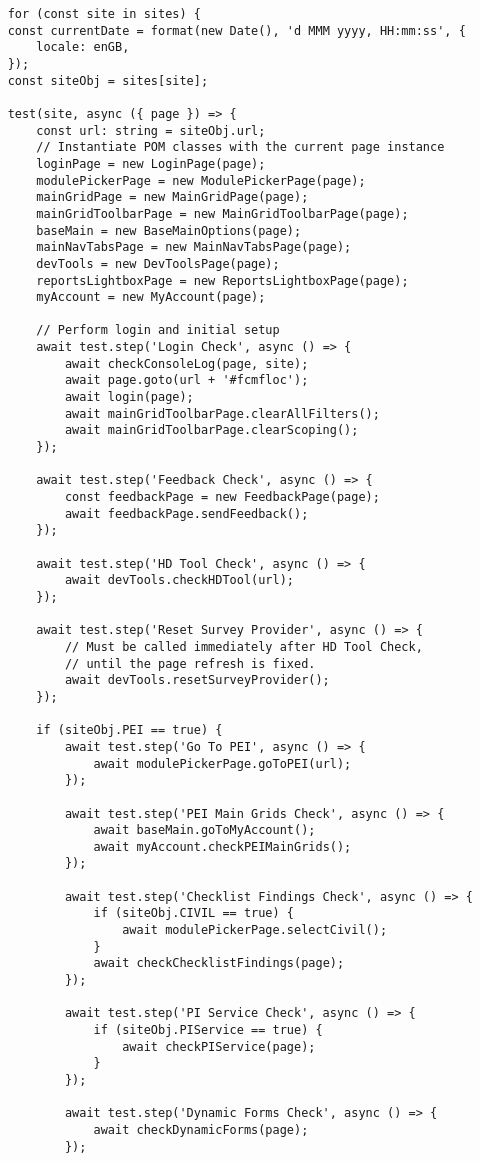 \begin{verbatim}
    for (const site in sites) {
    const currentDate = format(new Date(), 'd MMM yyyy, HH:mm:ss', {
        locale: enGB,
    });
    const siteObj = sites[site];

    test(site, async ({ page }) => {
        const url: string = siteObj.url;
        // Instantiate POM classes with the current page instance
        loginPage = new LoginPage(page);
        modulePickerPage = new ModulePickerPage(page);
        mainGridPage = new MainGridPage(page);
        mainGridToolbarPage = new MainGridToolbarPage(page);
        baseMain = new BaseMainOptions(page);
        mainNavTabsPage = new MainNavTabsPage(page);
        devTools = new DevToolsPage(page);
        reportsLightboxPage = new ReportsLightboxPage(page);
        myAccount = new MyAccount(page);

        // Perform login and initial setup
        await test.step('Login Check', async () => {
            await checkConsoleLog(page, site);
            await page.goto(url + '#fcmfloc');
            await login(page);
            await mainGridToolbarPage.clearAllFilters();
            await mainGridToolbarPage.clearScoping();
        });

		await test.step('Feedback Check', async () => {
			const feedbackPage = new FeedbackPage(page);
			await feedbackPage.sendFeedback();
		});

		await test.step('HD Tool Check', async () => {
			await devTools.checkHDTool(url);
		});

		await test.step('Reset Survey Provider', async () => {
			// Must be called immediately after HD Tool Check,
			// until the page refresh is fixed.
			await devTools.resetSurveyProvider();
		});

		if (siteObj.PEI == true) {
			await test.step('Go To PEI', async () => {
				await modulePickerPage.goToPEI(url);
			});

			await test.step('PEI Main Grids Check', async () => {
				await baseMain.goToMyAccount();
				await myAccount.checkPEIMainGrids();
			});

			await test.step('Checklist Findings Check', async () => {
				if (siteObj.CIVIL == true) {
					await modulePickerPage.selectCivil();
				}
				await checkChecklistFindings(page);
			});

			await test.step('PI Service Check', async () => {
				if (siteObj.PIService == true) {
					await checkPIService(page);
				}
			});

			await test.step('Dynamic Forms Check', async () => {
				await checkDynamicForms(page);
			});


\end{verbatim}
